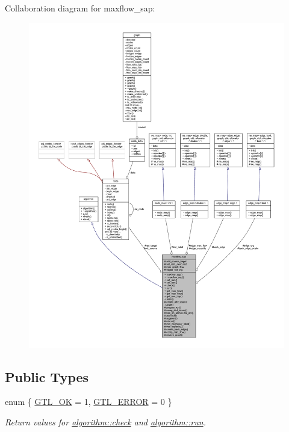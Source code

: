 Collaboration diagram for maxflow\+\_\+sap\+:\nopagebreak
\begin{figure}[H]
\begin{center}
\leavevmode
\includegraphics[width=350pt]{classmaxflow__sap__coll__graph}
\end{center}
\end{figure}
\subsection*{Public Types}
\begin{DoxyCompactItemize}
\item 
enum \{ \mbox{\hyperlink{classalgorithm_af1a0078e153aa99c24f9bdf0d97f6710a5114c20e4a96a76b5de9f28bf15e282b}{G\+T\+L\+\_\+\+OK}} = 1, 
\mbox{\hyperlink{classalgorithm_af1a0078e153aa99c24f9bdf0d97f6710a6fcf574690bbd6cf710837a169510dd7}{G\+T\+L\+\_\+\+E\+R\+R\+OR}} = 0
 \}
\begin{DoxyCompactList}\small\item\em Return values for \mbox{\hyperlink{classalgorithm_a76361fb03ad1cf643affc51821e43bed}{algorithm\+::check}} and \mbox{\hyperlink{classalgorithm_a734b189509a8d6b56b65f8ff772d43ca}{algorithm\+::run}}. \end{DoxyCompactList}\end{DoxyCompactItemize}
